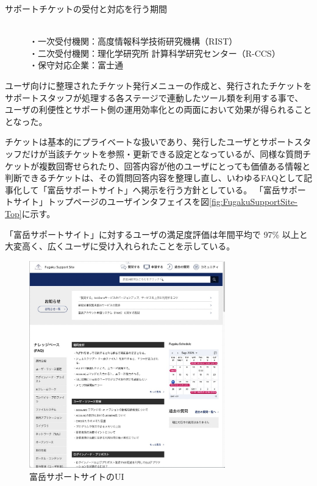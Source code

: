 \documentclass{jsaxiesproc}
\begin{document}
\begin{description}
\item[サポートチケットの受付と対応を行う期間]\mbox{}\\
・一次受付機関：高度情報科学技術研究機構（RIST）\\
・二次受付機関：理化学研究所 計算科学研究センター（R-CCS）\\
・保守対応企業：富士通
\end{description}

ユーザ向けに整理されたチケット発行メニューの作成と、発行されたチケットをサポートスタッフが処理する各ステージで連動したツール類を利用する事で、
ユーザの利便性とサポート側の運用効率化との両面において効果が得られることとなった。

チケットは基本的にプライベートな扱いであり、発行したユーザとサポートスタッフだけが当該チケットを参照・更新できる設定となっているが、同様な質問チケットが複数回寄せられたり、回答内容が他のユーザにとっても価値ある情報と判断できるチケットは、その質問回答内容を整理し直し、いわゆるFAQとして記事化して「富岳サポートサイト」へ掲示を行う方針としている。
「富岳サポートサイト」トップページのユーザインタフェイスを図\ref{fig:FugakuSupportSite-Top}に示す。

「富岳サポートサイト」に対するユーザの満足度評価は年間平均で 97\% 以上と大変高く、広くユーザに受け入れられたことを示している。

\begin{figure}[htbp]
\includegraphics[width=8.5cm]{figs/FugakuSupportSite-Top.jpg}
\caption{富岳サポートサイトのUI}
\label{fig:FugakuSupport-SiteTop}
\end{figure}
\end{document}
